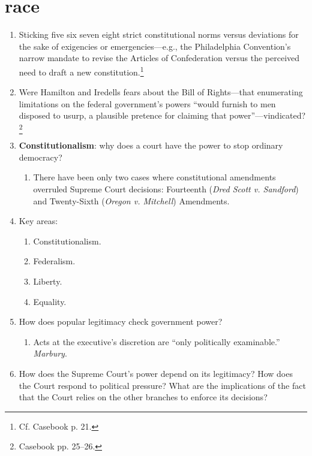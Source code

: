 \section{race}

\begin{enumerate}
    \item Sticking five six seven eight strict constitutional norms versus deviations for the 
    sake of exigencies or emergencies---e.g., the Philadelphia Convention's 
    narrow mandate to revise the Articles of Confederation versus the 
    perceived need to draft a new constitution.\footnote{Cf. Casebook p. 21.}
    \item Were Hamilton and Iredells fears about the Bill of Rights---that 
    enumerating limitations on the federal government's powers ``would furnish 
    to men disposed to usurp, a plausible pretence for claiming that 
    power''---vindicated?\footnote{Casebook pp. 25--26.}
    \item \textbf{Constitutionalism}: why does a court have the power to stop 
    ordinary democracy?
    \begin{enumerate}
        \item There have been only two cases where constitutional amendments 
        overruled Supreme Court decisions: Fourteenth (\emph{Dred Scott v. 
        Sandford}) and Twenty-Sixth (\emph{Oregon v. Mitchell}) Amendments.
    \end{enumerate}
    \item Key areas:
    \begin{enumerate}
        \item Constitutionalism.
        \item Federalism.
        \item Liberty.
        \item Equality.
    \end{enumerate}
    \item How does popular legitimacy check government power?
    \begin{enumerate}
        \item Acts at the executive's discretion are ``only politically 
        examinable.'' \emph{Marbury}.
    \end{enumerate}
    \item How does the Supreme Court's power depend on its legitimacy? How 
    does the Court respond to political pressure? What are the implications of 
    the fact that the Court relies on the other branches to enforce its 
    decisions?

\end{enumerate}
